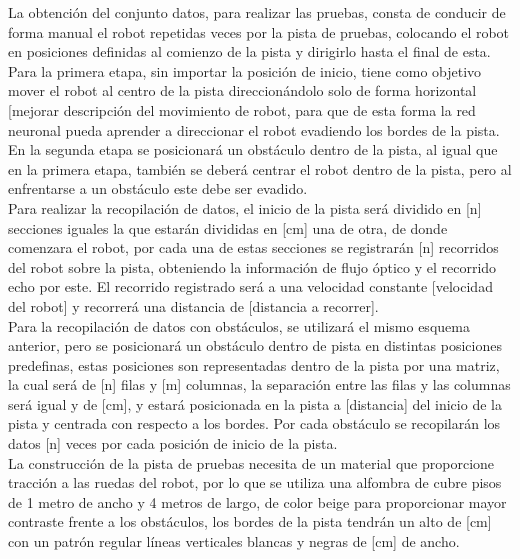 \documentclass{iccmemoria}
\begin{document}
La obtención del conjunto datos, para realizar las pruebas, consta de conducir de forma manual el robot repetidas veces por la pista de pruebas, colocando el robot en posiciones definidas al comienzo de la pista y dirigirlo hasta el final de esta.\\

Para la primera etapa, sin importar la posición de inicio, tiene como objetivo mover el robot al centro de la pista direccionándolo solo de forma horizontal [mejorar descripción del movimiento de robot, para que de esta forma la red neuronal pueda aprender a direccionar el robot evadiendo los bordes de la pista.\\

En la segunda etapa se posicionará un obstáculo dentro de la pista, al igual que en la primera etapa, también se deberá centrar el robot dentro de la pista, pero al enfrentarse a un obstáculo este debe ser evadido.\\

Para realizar la recopilación de datos, el inicio de la pista será dividido en [n] secciones iguales la que estarán divididas en [cm] una de otra, de donde comenzara el robot, por cada una de estas secciones se registrarán [n] recorridos del robot sobre la pista, obteniendo la información de flujo óptico y el recorrido echo por este. El recorrido registrado será a una velocidad constante [velocidad del robot] y recorrerá una distancia de [distancia a recorrer].\\

Para la recopilación de datos con obstáculos, se utilizará el mismo esquema anterior, pero se posicionará un obstáculo dentro de pista en distintas posiciones predefinas, estas posiciones son representadas dentro de la pista por una matriz, la cual será de [n] filas y [m] columnas, la separación entre las filas y las columnas será igual y de [cm], y estará posicionada en la pista a [distancia] del inicio de la pista y centrada con respecto a los bordes. Por cada obstáculo se recopilarán los datos [n] veces por cada posición de inicio de la pista.\\

La construcción de la pista de pruebas necesita de un material que proporcione tracción a las ruedas del robot, por lo que se utiliza una alfombra de cubre pisos de 1 metro de ancho y 4 metros de largo, de color beige para proporcionar mayor contraste frente a los obstáculos, los bordes de la pista tendrán un alto de [cm] con un patrón regular líneas verticales blancas y negras de [cm] de ancho.
\end{document}
